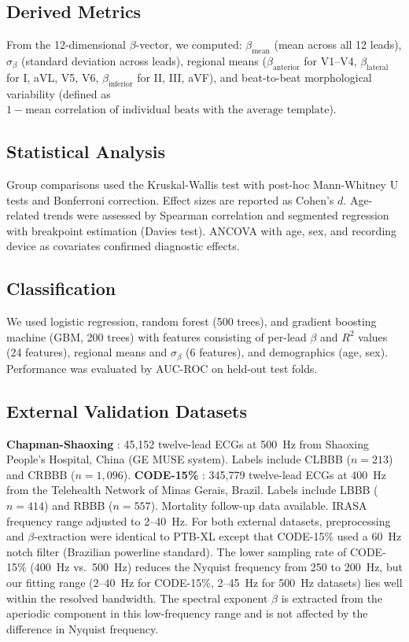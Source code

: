 \documentclass[11pt,a4paper]{article}
\begin{document}
\subsection{Derived Metrics}
From the 12-dimensional $\beta$-vector, we computed: $\beta_\text{mean}$ (mean across all 12 leads), $\sigma_\beta$ (standard deviation across leads), regional means ($\beta_\text{anterior}$ for V1--V4, $\beta_\text{lateral}$ for I, aVL, V5, V6, $\beta_\text{inferior}$ for II, III, aVF), and beat-to-beat morphological variability (defined as $1 - \text{mean correlation of individual beats with the average template}$).
\subsection{Statistical Analysis}
Group comparisons used the Kruskal-Wallis test with post-hoc Mann-Whitney U tests and Bonferroni correction. Effect sizes are reported as Cohen's $d$. Age-related trends were assessed by Spearman correlation and segmented regression with breakpoint estimation (Davies test). ANCOVA with age, sex, and recording device as covariates confirmed diagnostic effects.
\subsection{Classification}
We used logistic regression, random forest (500 trees), and gradient boosting machine (GBM, 200 trees) with features consisting of per-lead $\beta$ and $R^2$ values (24 features), regional means and $\sigma_\beta$ (6 features), and demographics (age, sex). Performance was evaluated by AUC-ROC on held-out test folds.
\subsection{External Validation Datasets}
\textbf{Chapman-Shaoxing} \citep{Zheng2020}: 45,152 twelve-lead ECGs at 500~Hz from Shaoxing People's Hospital, China (GE MUSE system). Labels include CLBBB ($n = 213$) and CRBBB ($n = 1{,}096$).
\textbf{CODE-15\%} \citep{Ribeiro2020}: 345,779 twelve-lead ECGs at 400~Hz from the Telehealth Network of Minas Gerais, Brazil. Labels include LBBB ($n = 414$) and RBBB ($n = 557$). Mortality follow-up data available. IRASA frequency range adjusted to 2--40~Hz.
For both external datasets, preprocessing and $\beta$-extraction were identical to PTB-XL except that CODE-15\% used a 60~Hz notch filter (Brazilian powerline standard). The lower sampling rate of CODE-15\% (400~Hz vs.\ 500~Hz) reduces the Nyquist frequency from 250 to 200~Hz, but our fitting range (2--40~Hz for CODE-15\%, 2--45~Hz for 500~Hz datasets) lies well within the resolved bandwidth. The spectral exponent $\beta$ is extracted from the aperiodic component in this low-frequency range and is not affected by the difference in Nyquist frequency.
\end{document}
